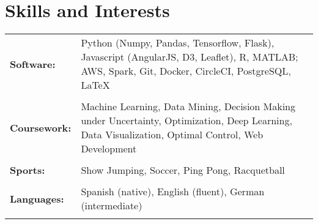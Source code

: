 \documentclass[a4paper,10pt]{article}
\begin{document}









\section{Skills and Interests}
\begin{tabularx}{\textwidth}{lX}
\bf{Software:}& Python (Numpy, Pandas, Tensorflow, Flask), Javascript (AngularJS, D3, Leaflet), R, MATLAB; AWS, Spark, Git, Docker, CircleCI, PostgreSQL, \LaTeX \\ \\ 

 \bf{Coursework:}& Machine Learning, Data Mining, Decision Making under Uncertainty, Optimization, Deep Learning, Data Visualization, Optimal Control, Web Development\\ \\ 

 \bf{Sports:}& Show Jumping, Soccer, Ping Pong, Racquetball\\ \\

 \bf{Languages:}& Spanish (native), English (fluent), German (intermediate)\\ \\ 
\end{tabularx}

\nocite{*}


\end{document}
